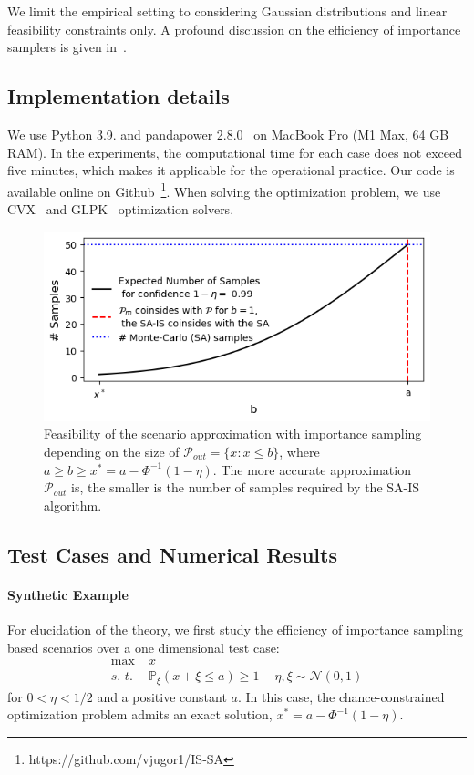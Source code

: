 We limit the empirical setting to considering Gaussian distributions and linear feasibility constraints only.
A profound discussion on the efficiency of importance samplers is given in~\cite{lukashevich2021power}.
\subsection{Implementation details} We use Python 3.9. and pandapower 2.8.0~\cite{thurner2018pandapower} on MacBook Pro (M1 Max, 64 GB RAM). In the experiments, the computational time for each case does not exceed five minutes, which makes it applicable for the operational practice. Our code is available online on Github~\footnote{https://github.com/vjugor1/IS-SA}. When solving the optimization problem, we use CVX~\cite{diamond2016cvxpy} and GLPK~\cite{GLPK} optimization solvers. 
\begin{figure}[!t]
  \centering
  \includegraphics[width=.48\textwidth]{Dissertation/images/dc_stochastic_approx/figure120.png}
  \caption{
  Feasibility of the scenario approximation with importance sampling depending on the size of $\mathcal{P}_{out}= \{x: x\le b\}$, where $a \geq b\geq x^* =a - \Phi^{-1}(1-\eta)$. The more accurate approximation $\mathcal{P}_{out}$ is, the smaller is the number of samples required by the SA-IS algorithm.}
  \label{fig:80}
  
\end{figure}

\subsection{Test Cases and Numerical Results}
\paragraph{Synthetic Example}
For elucidation of the theory, we first study the efficiency of importance sampling based scenarios over a one dimensional test case:
\begin{align*}
  \max\; & x\\
  \textit{s. t. } & \mathbb{P}_\xi(x+\xi \le a) \ge 1-\eta, \xi\sim \mathcal{N}(0,1)
\end{align*}
for $0 < \eta < 1/2$ and a positive constant $a$. In this case, the chance-constrained optimization problem admits an exact solution, $x^* = a - \Phi^{-1}(1-\eta)$. 

